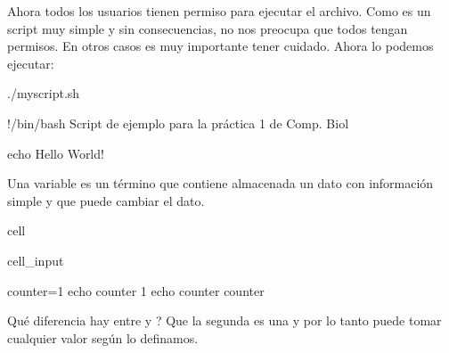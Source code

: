 \documentclass[letterpaper,10pt,english]{jupyterBook}
\begin{document}
\sphinxAtStartPar
Ahora todos los usuarios tienen permiso para ejecutar el archivo. Como es un script muy simple y sin consecuencias, no nos preocupa que todos tengan permisos. En otros casos es muy importante tener cuidado. Ahora lo podemos ejecutar:

\begin{sphinxVerbatim}[commandchars=\\\{\}]
\PYGZdl{} ./myscript.sh
\end{sphinxVerbatim}



\begin{sphinxVerbatim}[commandchars=\\\{\}]
\PYGZsh{}!/bin/bash
\PYGZsh{} Script de ejemplo para la práctica 1 de Comp. Biol

echo Hello World!
\end{sphinxVerbatim}

\begin{DUlineblock}{0em}
\item[] 
\end{DUlineblock}

\sphinxAtStartPar
Una variable es un término que contiene almacenada un dato con información simple y que puede cambiar el dato.

\begin{sphinxuseclass}{cell}\begin{sphinxVerbatimInput}

\begin{sphinxuseclass}{cell_input}
\begin{sphinxVerbatim}[commandchars=\\\{\}]
\PYGZdl{} counter=1
\PYGZdl{} echo \PYGZdl{}counter 
\PYGZdl{} 1
\PYGZdl{} echo counter
\PYGZdl{} counter
\end{sphinxVerbatim}

\end{sphinxuseclass}\end{sphinxVerbatimInput}

\end{sphinxuseclass}
\sphinxAtStartPar
Qué diferencia hay entre  y ? Que la segunda es una  y por lo tanto puede tomar cualquier valor según lo definamos.

\begin{DUlineblock}{0em}
\item[] 
\end{DUlineblock}
\end{document}
